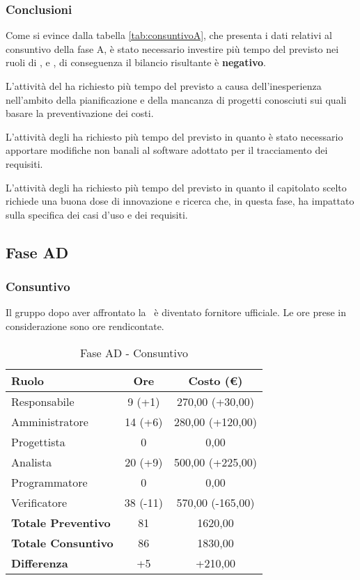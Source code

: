 \documentclass[../PianoProgetto.tex]{subfiles}
\begin{document}
		\subsubsection{Conclusioni}	
		Come si evince dalla tabella \ref{tab:consuntivoA}, che presenta i dati relativi al consuntivo della fase A, è stato necessario investire più tempo del previsto nei ruoli di \responsabilediprogetto{}, \amministratore{} e \analista, di conseguenza il bilancio risultante è \textbf{negativo}.
		
		L'attività del \responsabilediprogetto{} ha richiesto più tempo del previsto a causa dell'inesperienza nell'ambito della pianificazione e della mancanza di progetti conosciuti sui quali basare la preventivazione dei costi.		
		
		L'attività degli \amministratori{} ha richiesto più tempo del previsto in quanto è stato necessario apportare modifiche non banali al software adottato per il tracciamento dei requisiti.
		
		L'attività degli \analisti{} ha richiesto più tempo del previsto in quanto il capitolato scelto richiede una buona dose di innovazione e ricerca che, in questa fase, ha impattato sulla specifica dei casi d'uso e dei requisiti.

	\subsection{Fase AD}
	\subsubsection{Consuntivo}
	Il gruppo dopo aver affrontato la \revisionedeirequisiti\ è diventato fornitore ufficiale. Le ore prese in considerazione sono ore rendicontate. 
	
	\begin{table}[h]
		\centering
		\begin{tabular}{l * {2}{c}}
			\toprule
			\textbf{Ruolo} & \textbf{Ore} & \textbf{Costo (\euro{})} \\
			\midrule
			Responsabile &	9 (+1) & 270,00 (+30,00)\\
			Amministratore &  14 (+6) & 280,00 (+120,00)\\
			Progettista & 0 & 0,00 \\
			Analista & 20 (+9) & 500,00 (+225,00)\\
			Programmatore & 0 & 0,00 \\
			Verificatore & 38 (-11) & 570,00 (-165,00)\\
			\midrule
			\textbf{Totale Preventivo} & 81
			& 1620,00
			\\		
			\textbf{Totale Consuntivo} & 86 & 1830,00 
			\\
			\midrule
			\textbf{Differenza} & +5 & +210,00 \\
			\bottomrule
		\end{tabular}
		
		\caption{Fase AD - Consuntivo}
		\label{tab:consuntivoAD}
		
	\end{table}		
	
\end{document}
